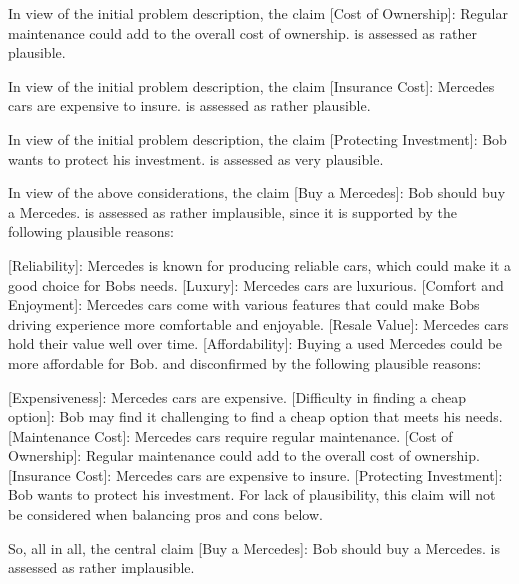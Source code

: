 \documentclass[
  letterpaper,
  DIV=11,
  numbers=noendperiod]{scrartcl}
\newenvironment{Shaded}{\begin{snugshade}}{\end{snugshade}}
\newcommand{\CommentTok}[1]{\textcolor[rgb]{0.37,0.37,0.37}{#1}}
\newcommand{\NormalTok}[1]{\textcolor[rgb]{0.00,0.23,0.31}{#1}}
\newcommand{\OtherTok}[1]{\textcolor[rgb]{0.00,0.23,0.31}{#1}}
\begin{document}
\begin{Shaded}
\begin{Highlighting}[]
\NormalTok{In view of the initial problem description, the claim \textquotesingle{}}\CommentTok{[}\OtherTok{Cost of Ownership}\CommentTok{]}\NormalTok{: Regular maintenance could add to the overall cost of ownership.\textquotesingle{} is assessed as rather plausible.}

\NormalTok{In view of the initial problem description, the claim \textquotesingle{}}\CommentTok{[}\OtherTok{Insurance Cost}\CommentTok{]}\NormalTok{: Mercedes cars are expensive to insure.\textquotesingle{} is assessed as rather plausible.}

\NormalTok{In view of the initial problem description, the claim \textquotesingle{}}\CommentTok{[}\OtherTok{Protecting Investment}\CommentTok{]}\NormalTok{: Bob wants to protect his investment.\textquotesingle{} is assessed as very plausible.}

\NormalTok{In view of the above considerations, the claim \textquotesingle{}}\CommentTok{[}\OtherTok{Buy a Mercedes}\CommentTok{]}\NormalTok{: Bob should buy a Mercedes.\textquotesingle{} is assessed as rather implausible, since it is supported by the following plausible reasons:}

\OtherTok{[Reliability]: }\NormalTok{Mercedes is known for producing reliable cars, which could make it a good choice for Bob\textquotesingle{}s needs.}
\OtherTok{[Luxury]: }\NormalTok{Mercedes cars are luxurious.}
\OtherTok{[Comfort and Enjoyment]: }\NormalTok{Mercedes cars come with various features that could make Bob\textquotesingle{}s driving experience more comfortable and enjoyable.}
\OtherTok{[Resale Value]: }\NormalTok{Mercedes cars hold their value well over time.}
\OtherTok{[Affordability]: }\NormalTok{Buying a used Mercedes could be more affordable for Bob.}
\NormalTok{and disconfirmed by the following plausible reasons:}

\OtherTok{[Expensiveness]: }\NormalTok{Mercedes cars are expensive.}
\OtherTok{[Difficulty in finding a cheap option]: }\NormalTok{Bob may find it challenging to find a cheap option that meets his needs.}
\OtherTok{[Maintenance Cost]: }\NormalTok{Mercedes cars require regular maintenance.}
\OtherTok{[Cost of Ownership]: }\NormalTok{Regular maintenance could add to the overall cost of ownership.}
\OtherTok{[Insurance Cost]: }\NormalTok{Mercedes cars are expensive to insure.}
\OtherTok{[Protecting Investment]: }\NormalTok{Bob wants to protect his investment.}
\NormalTok{For lack of plausibility, this claim will not be considered when balancing pros and cons below.}

\NormalTok{So, all in all, the central claim \textquotesingle{}}\CommentTok{[}\OtherTok{Buy a Mercedes}\CommentTok{]}\NormalTok{: Bob should buy a Mercedes.\textquotesingle{} is assessed as rather implausible.}


\end{Highlighting}
\end{Shaded}
\end{document}
